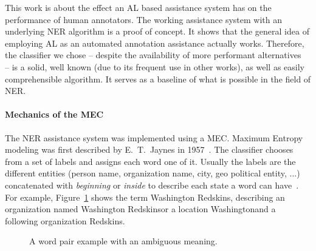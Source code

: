 		This work is about the effect an \ac{AL} based assistance system has on the performance of human annotators. The working assistance system with an underlying \ac{NER} algorithm is a proof of concept. It shows that the general idea of employing \ac{AL} as an automated annotation assistance actually works. Therefore, the classifier we chose -- despite the availability of more performant alternatives~\cite{benikova2014germeval} -- is a solid, well known (due to its frequent use in other works), as well as easily comprehensible algorithm. It serves as a baseline of what is possible in the field of \ac{NER}.

		\paragraph{Mechanics of the \acl{MEC}}
		\label{sec:algorithmicFoundationMEC}
		The \ac{NER} assistance system was implemented using a \acf{MEC}. Maximum Entropy modeling was first described by E.~T.~Jaynes in 1957~\cite{jaynes1957}. The classifier chooses from a set of labels and assigns each word one of it. Usually the labels are the different entities (person name, organization name, city, geo political entity, ...) concatenated with \textit{beginning} or \textit{inside} to describe each state a word can have~\cite{tjong2003introduction}. For example, Figure~\ref{fig:ambiguousWordPair} shows the term \lqq Washington Redskins\rqq, describing an organization named \lqq Washington Redskins\rqq or a location \lqq Washington\rqq and a following organization \lqq Redskins\rqq.

		\begin{figure}[h]
		  \centering
		  \qquad
		  \caption{A word pair example with an ambiguous meaning.}%
		  \label{fig:ambiguousWordPair}%
		\end{figure}

